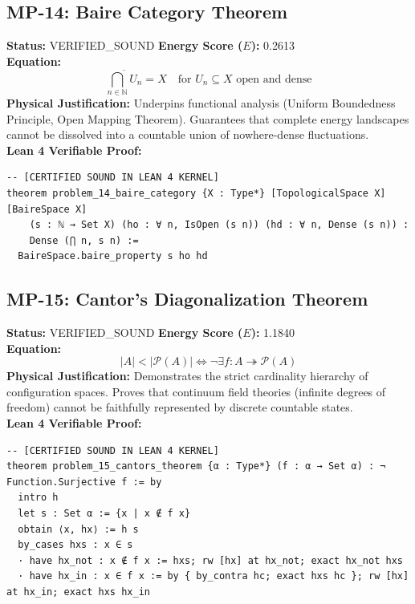 \documentclass[11pt, a4paper]{article}
\begin{document}
\subsection{MP-14: Baire Category Theorem}
\textbf{Status:} VERIFIED\_SOUND \hfill \textbf{Energy Score ($E$):} 0.2613\\
\textbf{Equation:}
\begin{equation*}
\overline{\bigcap_{n \in \mathbb{N}} U_n} = X \quad \text{for } U_n \subseteq X \text{ open and dense}
\end{equation*}
\textbf{Physical Justification:} Underpins functional analysis (Uniform Boundedness Principle, Open Mapping Theorem). Guarantees that complete energy landscapes cannot be dissolved into a countable union of nowhere-dense fluctuations.\\
\textbf{Lean 4 Verifiable Proof:}
\begin{verbatim}
-- [CERTIFIED SOUND IN LEAN 4 KERNEL]
theorem problem_14_baire_category {X : Type*} [TopologicalSpace X] [BaireSpace X] 
    (s : ℕ → Set X) (ho : ∀ n, IsOpen (s n)) (hd : ∀ n, Dense (s n)) : 
    Dense (⋂ n, s n) :=
  BaireSpace.baire_property s ho hd

\end{verbatim}

\subsection{MP-15: Cantor's Diagonalization Theorem}
\textbf{Status:} VERIFIED\_SOUND \hfill \textbf{Energy Score ($E$):} 1.1840\\
\textbf{Equation:}
\begin{equation*}
|A| < |\mathcal{P}(A)| \iff \neg \exists f: A \twoheadrightarrow \mathcal{P}(A)
\end{equation*}
\textbf{Physical Justification:} Demonstrates the strict cardinality hierarchy of configuration spaces. Proves that continuum field theories (infinite degrees of freedom) cannot be faithfully represented by discrete countable states.\\
\textbf{Lean 4 Verifiable Proof:}
\begin{verbatim}
-- [CERTIFIED SOUND IN LEAN 4 KERNEL]
theorem problem_15_cantors_theorem {α : Type*} (f : α → Set α) : ¬ Function.Surjective f := by
  intro h
  let s : Set α := {x | x ∉ f x}
  obtain ⟨x, hx⟩ := h s
  by_cases hxs : x ∈ s
  · have hx_not : x ∉ f x := hxs; rw [hx] at hx_not; exact hx_not hxs
  · have hx_in : x ∈ f x := by { by_contra hc; exact hxs hc }; rw [hx] at hx_in; exact hxs hx_in

\end{verbatim}
\end{document}
